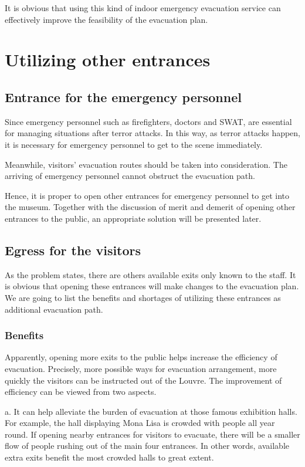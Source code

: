 \documentclass{mcmthesis}
\begin{document}
	It is obvious that using this kind of indoor emergency evacuation service can effectively improve the feasibility of the evacuation plan.
	
	\section{ Utilizing other entrances}
	
	\subsection{Entrance for the emergency personnel}
	Since emergency personnel such as firefighters, doctors and SWAT, are essential for managing situations after terror attacks. In this way, as terror attacks happen, it is necessary for emergency personnel to get to the scene immediately. 
	
	Meanwhile, visitors' evacuation routes should be taken into consideration. The arriving of emergency personnel cannot obstruct the evacuation path. 
	
	Hence, it is proper to open other entrances for emergency personnel to get into the museum. Together with the discussion of merit and demerit of opening other entrances to the public, an appropriate solution will be presented later.
	
	\subsection{Egress for the visitors}
	
	As the problem states, there are others available exits only known to the staff. It is obvious that opening these entrances will make changes to the evacuation plan. We are going to list the benefits and shortages of utilizing these entrances as additional evacuation path.
	
	\subsubsection{Benefits}
	
	Apparently, opening more exits to the public helps increase the efficiency of evacuation. Precisely, more possible ways for evacuation arrangement, more quickly the visitors can be instructed out of the Louvre.  The improvement of efficiency can be viewed from two aspects.
	
	a. It can help alleviate the burden of evacuation at those famous exhibition halls. For example, the hall displaying Mona Lisa is crowded with people all year round. If opening nearby entrances for visitors to evacuate, there will be a smaller flow of people rushing out of the main four entrances. In other words, available extra exits benefit the most crowded halls to great extent.
	
\end{document}
